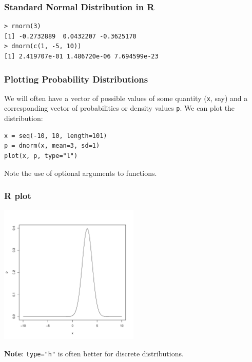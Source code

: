 \documentclass{beamer}
\begin{document}
\begin{frame}[fragile]
\frametitle{Standard Normal Distribution in R}
\begin{verbatim}
> rnorm(3)
[1] -0.2732889  0.0432207 -0.3625170
> dnorm(c(1, -5, 10))
[1] 2.419707e-01 1.486720e-06 7.694599e-23
\end{verbatim}
\end{frame}


\begin{frame}[fragile]
\frametitle{Plotting Probability Distributions}
We will often have a vector of possible values of some
quantity (\texttt{x}, say) and a corresponding vector of
probabilities or density values
\texttt{p}. We can plot the distribution:
\begin{verbatim}
x = seq(-10, 10, length=101)
p = dnorm(x, mean=3, sd=1)
plot(x, p, type="l")
\end{verbatim}
Note the use of optional arguments to functions.
\end{frame}


\begin{frame}[fragile]
\frametitle{R plot}

\begin{center}
\includegraphics[width=0.5\textwidth]{images/R_normal.pdf}
\end{center}
\vspace{-1.5em}
{\bf Note}: \texttt{type="h"} is often better for
discrete distributions.
\end{frame}
\end{document}
